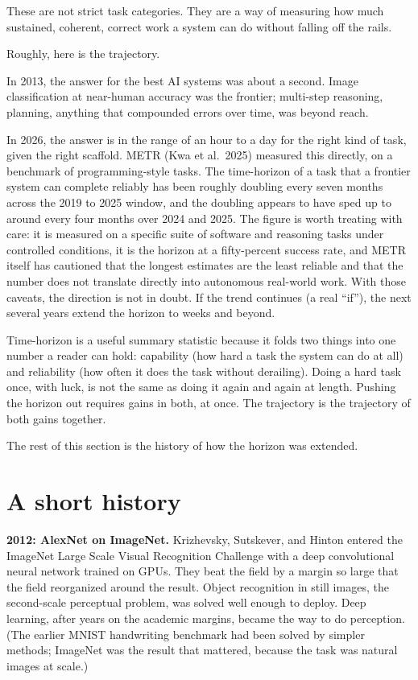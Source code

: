 These are not strict task categories. They are a way of measuring how much sustained, coherent, correct work a system can do without falling off the rails.

Roughly, here is the trajectory.

In 2013, the answer for the best AI systems was about a second. Image classification at near-human accuracy was the frontier; multi-step reasoning, planning, anything that compounded errors over time, was beyond reach.

In 2026, the answer is in the range of an hour to a day for the right kind of task, given the right scaffold. METR (Kwa et al.\ 2025) measured this directly, on a benchmark of programming-style tasks. The time-horizon of a task that a frontier system can complete reliably has been roughly doubling every seven months across the 2019 to 2025 window, and the doubling appears to have sped up to around every four months over 2024 and 2025. The figure is worth treating with care: it is measured on a specific suite of software and reasoning tasks under controlled conditions, it is the horizon at a fifty-percent success rate, and METR itself has cautioned that the longest estimates are the least reliable and that the number does not translate directly into autonomous real-world work. With those caveats, the direction is not in doubt. If the trend continues (a real ``if''), the next several years extend the horizon to weeks and beyond.

Time-horizon is a useful summary statistic because it folds two things into one number a reader can hold: capability (how hard a task the system can do at all) and reliability (how often it does the task without derailing). Doing a hard task once, with luck, is not the same as doing it again and again at length. Pushing the horizon out requires gains in both, at once. The trajectory is the trajectory of both gains together.

The rest of this section is the history of how the horizon was extended.

\section*{A short history}

\textbf{2012: AlexNet on ImageNet.} Krizhevsky, Sutskever, and Hinton entered the ImageNet Large Scale Visual Recognition Challenge with a deep convolutional neural network trained on GPUs. They beat the field by a margin so large that the field reorganized around the result. Object recognition in still images, the second-scale perceptual problem, was solved well enough to deploy. Deep learning, after years on the academic margins, became the way to do perception. (The earlier MNIST handwriting benchmark had been solved by simpler methods; ImageNet was the result that mattered, because the task was natural images at scale.)

